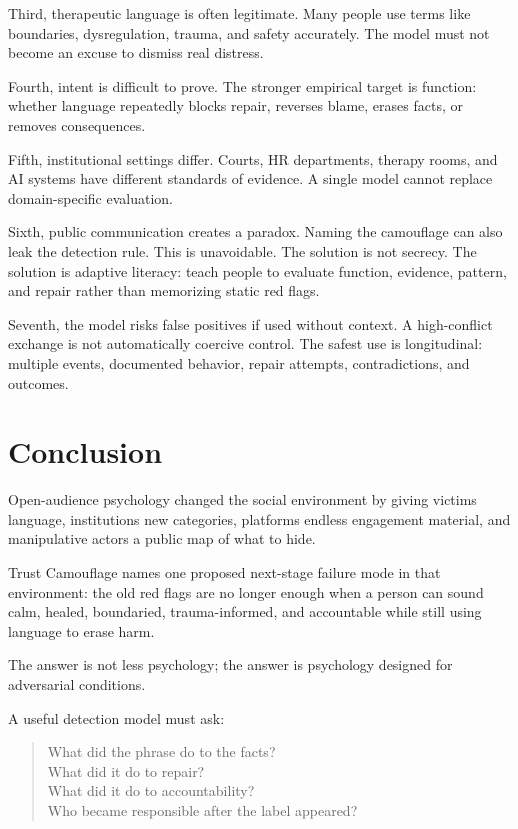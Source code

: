 \documentclass[11pt, letterpaper]{article}
\begin{document}
Third, therapeutic language is often legitimate. Many people use terms like boundaries, dysregulation, trauma, and safety accurately. The model must not become an excuse to dismiss real distress.

Fourth, intent is difficult to prove. The stronger empirical target is function: whether language repeatedly blocks repair, reverses blame, erases facts, or removes consequences.

Fifth, institutional settings differ. Courts, HR departments, therapy rooms, and AI systems have different standards of evidence. A single model cannot replace domain-specific evaluation.

Sixth, public communication creates a paradox. Naming the camouflage can also leak the detection rule. This is unavoidable. The solution is not secrecy. The solution is adaptive literacy: teach people to evaluate function, evidence, pattern, and repair rather than memorizing static red flags.

Seventh, the model risks false positives if used without context. A high-conflict exchange is not automatically coercive control. The safest use is longitudinal: multiple events, documented behavior, repair attempts, contradictions, and outcomes.

\section{Conclusion}

Open-audience psychology changed the social environment by giving victims language, institutions new categories, platforms endless engagement material, and manipulative actors a public map of what to hide.

Trust Camouflage names one proposed next-stage failure mode in that environment: the old red flags are no longer enough when a person can sound calm, healed, boundaried, trauma-informed, and accountable while still using language to erase harm.

The answer is not less psychology; the answer is psychology designed for adversarial conditions.

A useful detection model must ask:

\begin{quote}
What did the phrase do to the facts?\\
What did it do to repair?\\
What did it do to accountability?\\
Who became responsible after the label appeared?
\end{quote}
\end{document}
